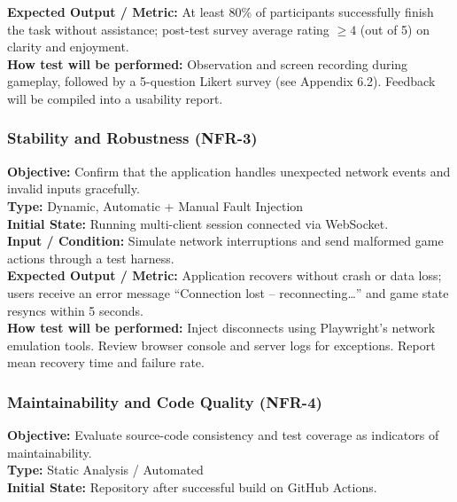 \documentclass[12pt, titlepage]{article}
\begin{document}
    \textbf{Expected Output / Metric:} At least 80\% of participants successfully finish the task without assistance; post-test survey average rating $\geq 4$ (out of 5) on clarity and enjoyment. \\

    \textbf{How test will be performed:}
    Observation and screen recording during gameplay, followed by a 5-question Likert survey (see Appendix 6.2).
    Feedback will be compiled into a usability report.

    \subsubsection{Stability and Robustness (NFR-3)}
    \textbf{Objective:} Confirm that the application handles unexpected network events and invalid inputs gracefully. \\

    \textbf{Type:} Dynamic, Automatic + Manual Fault Injection \\

    \textbf{Initial State:} Running multi-client session connected via WebSocket. \\

    \textbf{Input / Condition:} Simulate network interruptions and send malformed game actions through a test harness. \\

    \textbf{Expected Output / Metric:} Application recovers without crash or data loss; users receive an error message ``Connection lost – reconnecting…'' and game state resyncs within 5 seconds. \\

    \textbf{How test will be performed:}
    Inject disconnects using Playwright’s network emulation tools. Review browser console and server logs for exceptions. Report mean recovery time and failure rate.

    \subsubsection{Maintainability and Code Quality (NFR-4)}
    \textbf{Objective:} Evaluate source-code consistency and test coverage as indicators of maintainability. \\

    \textbf{Type:} Static Analysis / Automated \\

    \textbf{Initial State:} Repository after successful build on GitHub Actions. \\
\end{document}
